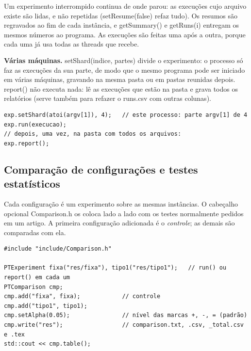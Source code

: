 \documentclass[10pt,a4paper]{article}
\newcommand{\code}[1]{{\ttfamily #1}}
\begin{document}
Um experimento interrompido continua de onde parou: as execuções cujo arquivo existe são lidas, e não repetidas (\code{setResume(false)} refaz tudo). Os resumos são regravados ao fim de cada instância, e \code{getSummary()} e \code{getRuns(i)} entregam os mesmos números ao programa. As execuções são feitas uma após a outra, porque cada uma já usa todas as threads que recebe.

\textbf{Várias máquinas.} \code{setShard(indice, partes)} divide o experimento: o processo só faz as execuções da sua parte, de modo que o mesmo programa pode ser iniciado em várias máquinas, gravando na mesma pasta ou em pastas reunidas depois. \code{report()} não executa nada: lê as execuções que estão na pasta e grava todos os relatórios (serve também para refazer o \code{runs.csv} com outras colunas).

\begin{lstlisting}[style=cpp]
exp.setShard(atoi(argv[1]), 4);   // este processo: parte argv[1] de 4
exp.run(execucao);
// depois, uma vez, na pasta com todos os arquivos:
exp.report();
\end{lstlisting}

\subsection{Comparação de configurações e testes estatísticos}

Cada configuração é um experimento sobre as mesmas instâncias. O cabeçalho opcional \code{Comparison.h} os coloca lado a lado com os testes normalmente pedidos em um artigo. A primeira configuração adicionada é o \textit{controle}; as demais são comparadas com ela.

\begin{lstlisting}[style=cpp]
#include "include/Comparison.h"

PTExperiment fixa("res/fixa"), tipo1("res/tipo1");   // run() ou report() em cada um
PTComparison cmp;
cmp.add("fixa", fixa);            // controle
cmp.add("tipo1", tipo1);
cmp.setAlpha(0.05);               // nível das marcas +, -, = (padrão)
cmp.write("res");                 // comparison.txt, .csv, _total.csv e .tex
std::cout << cmp.table();
\end{lstlisting}
\end{document}
